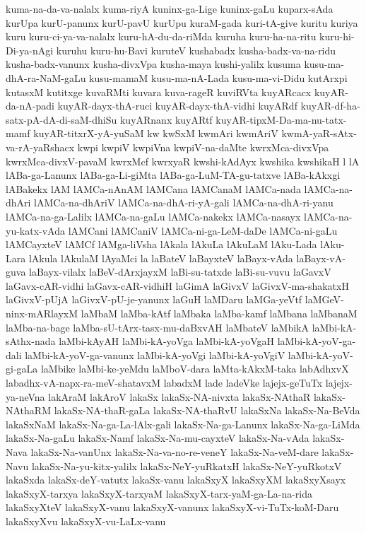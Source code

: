 {kuma-na-da-va-nalalx
kuma-riyA
kuninx-ga-Lige
kuninx-gaLu
kuparx-sAda
kurUpa
kurU-panunx
kurU-pavU
kurUpu
kuraM-gada
kuri-tA-give
kuritu
kuriya
kuru
kuru-ci-ya-va-nalalx
kuru-hA-du-da-riMda
kuruha
kuru-ha-na-ritu
kuru-hi-Di-ya-nAgi
kuruhu
kuru-hu-Bavi
kuruteV
kushabadx
kusha-badx-va-na-ridu
kusha-badx-vanunx
kusha-divxVpa
kusha-maya
kushi-yalilx
kusuma
kusu-ma-dhA-ra-NaM-gaLu
kusu-mamaM
kusu-ma-nA-Lada
kusu-ma-vi-Didu
kutArxpi
kutasxM
kutitxge
kuvaRMti
kuvara
kuva-rageR
kuviRVta
kuyARcacx
kuyAR-da-nA-padi
kuyAR-dayx-thA-ruci
kuyAR-dayx-thA-vidhi
kuyARdf
kuyAR-df-ha-satx-pA-dA-di-saM-dhiSu
kuyARnanx
kuyARtf
kuyAR-tipxM-Da-ma-nu-tatx-mamf
kuyAR-titxrX-yA-yuSaM
kw
kwSxM
kwmAri
kwmAriV
kwmA-yaR-sAtx-va-rA-yaRshacx
kwpi
kwpiV
kwpiVna
kwpiV-na-daMte
kwrxMca-divxVpa
kwrxMca-divxV-pavaM
kwrxMcf
kwrxyaR
kwshi-kAdAyx
kwshika
kwshikaH
l
lA
lABa-ga-Lanunx
lABa-ga-Li-giMta
lABa-ga-LuM-TA-gu-tatxve
lABa-kAkxgi
lABakekx
lAM
lAMCa-nAnAM
lAMCana
lAMCanaM
lAMCa-nada
lAMCa-na-dhAri
lAMCa-na-dhAriV
lAMCa-na-dhA-ri-yA-gali
lAMCa-na-dhA-ri-yanu
lAMCa-na-ga-Lalilx
lAMCa-na-gaLu
lAMCa-nakekx
lAMCa-nasayx
lAMCa-na-yu-katx-vAda
lAMCani
lAMCaniV
lAMCa-ni-ga-LeM-daDe
lAMCa-ni-gaLu
lAMCayxteV
lAMCf
lAMga-liVsha
lAkala
lAkuLa
lAkuLaM
lAku-Lada
lAku-Lara
lAkula
lAkulaM
lAyaMci
la
laBateV
laBayxteV
laBayx-vAda
laBayx-vA-guva
laBayx-vilalx
laBeV-dArxjayxM
laBi-su-tatxde
laBi-su-vuvu
laGavxV
laGavx-cAR-vidhi
laGavx-cAR-vidhiH
laGimA
laGivxV
laGivxV-ma-shakatxH
laGivxV-pUjA
laGivxV-pU-je-yanunx
laGuH
laMDaru
laMGa-yeVtf
laMGeV-ninx-mARlayxM
laMbaM
laMba-kAtf
laMbaka
laMba-kamf
laMbana
laMbanaM
laMba-na-bage
laMba-sU-tArx-tasx-mu-daBxvAH
laMbateV
laMbikA
laMbi-kA-sAthx-nada
laMbi-kAyAH
laMbi-kA-yoVga
laMbi-kA-yoVgaH
laMbi-kA-yoV-ga-dali
laMbi-kA-yoV-ga-vanunx
laMbi-kA-yoVgi
laMbi-kA-yoVgiV
laMbi-kA-yoV-gi-gaLa
laMbike
laMbi-ke-yeMdu
laMboV-dara
laMta-kAkxM-taka
labAdhxvX
labadhx-vA-napx-ra-meV-shatavxM
labadxM
lade
ladeVke
lajejx-geTuTx
lajejx-ya-neVna
lakAraM
lakAroV
lakaSx
lakaSx-NA-nivxta
lakaSx-NAthaR
lakaSx-NAthaRM
lakaSx-NA-thaR-gaLa
lakaSx-NA-thaRvU
lakaSxNa
lakaSx-Na-BeVda
lakaSxNaM
lakaSx-Na-ga-La-lAlx-gali
lakaSx-Na-ga-Lanunx
lakaSx-Na-ga-LiMda
lakaSx-Na-gaLu
lakaSx-Namf
lakaSx-Na-mu-cayxteV
lakaSx-Na-vAda
lakaSx-Nava
lakaSx-Na-vanUnx
lakaSx-Na-va-no-re-veneY
lakaSx-Na-veM-dare
lakaSx-Navu
lakaSx-Na-yu-kitx-yalilx
lakaSx-NeY-yuRkatxH
lakaSx-NeY-yuRkotxV
lakaSxda
lakaSx-deY-vatutx
lakaSx-vanu
lakaSxyX
lakaSxyXM
lakaSxyXsayx
lakaSxyX-tarxya
lakaSxyX-tarxyaM
lakaSxyX-tarx-yaM-ga-La-na-rida
lakaSxyXteV
lakaSxyX-vanu
lakaSxyX-vanunx
lakaSxyX-vi-TuTx-koM-Daru
lakaSxyXvu
lakaSxyX-vu-LaLx-vanu
}
